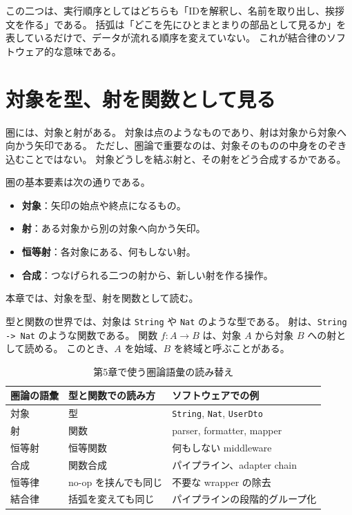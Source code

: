 この二つは、実行順序としてはどちらも「IDを解釈し、名前を取り出し、挨拶文を作る」である。
括弧は「どこを先にひとまとまりの部品として見るか」を表しているだけで、データが流れる順序を変えていない。
これが結合律のソフトウェア的な意味である。

\section{対象を型、射を関数として見る}

圏には、対象と射がある。
対象は点のようなものであり、射は対象から対象へ向かう矢印である。
ただし、圏論で重要なのは、対象そのものの中身をのぞき込むことではない。
対象どうしを結ぶ射と、その射をどう合成するかである。

\begin{definitionbox}
圏の基本要素は次の通りである。
\begin{itemize}
\item \textbf{対象}：矢印の始点や終点になるもの。
\item \textbf{射}：ある対象から別の対象へ向かう矢印。
\item \textbf{恒等射}：各対象にある、何もしない射。
\item \textbf{合成}：つなげられる二つの射から、新しい射を作る操作。
\end{itemize}
本章では、対象を型、射を関数として読む。
\end{definitionbox}

型と関数の世界では、対象は \texttt{String} や \texttt{Nat} のような型である。
射は、\texttt{String -> Nat} のような関数である。
関数 \(f : A \to B\) は、対象 \(A\) から対象 \(B\) への射として読める。
このとき、\(A\) を始域、\(B\) を終域と呼ぶことがある。

\begin{table}[htbp]
\centering
\begin{tabular}{lll}
\toprule
圏論の語彙 & 型と関数での読み方 & ソフトウェアでの例 \\
\midrule
対象 & 型 & \texttt{String}, \texttt{Nat}, \texttt{UserDto} \\
射 & 関数 & parser, formatter, mapper \\
恒等射 & 恒等関数 & 何もしない middleware \\
合成 & 関数合成 & パイプライン、adapter chain \\
恒等律 & no-op を挟んでも同じ & 不要な wrapper の除去 \\
結合律 & 括弧を変えても同じ & パイプラインの段階的グループ化 \\
\bottomrule
\end{tabular}
\caption{第5章で使う圏論語彙の読み替え}
\label{tab:ch05-vocabulary}
\end{table}

